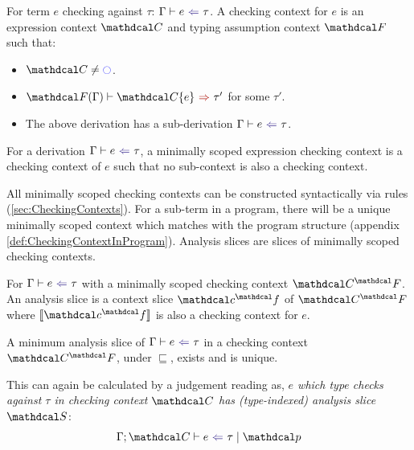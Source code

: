 \begin{definition}
\label{def:CheckingContext}
For term $e$ checking against $\tau$: $\analysis[\Gamma]{e}{\tau}$. A checking context for $e$ is an expression context $\C$ and typing assumption context $\F$ such that: 
\begin{itemize}
\item $\C \neq \cmark$.
\item $\synthesis[\F(\Gamma)]{\C\{e\}}{\tau'}$ for some $\tau'$.
\item The above derivation has a sub-derivation $\analysis[\Gamma]{e}{\tau}$.
\end{itemize}
\end{definition}
\begin{definition}
For a derivation $\analysis[\Gamma]{e}{\tau}$, a minimally scoped expression checking context is a checking context of $e$ such that no sub-context is also a checking context.
\end{definition}

All minimally scoped checking contexts can be constructed syntactically via rules (\cref{sec:CheckingContexts}). For a sub-term in a program, there will be a unique minimally scoped context which matches with the program structure (appendix \cref{def:CheckingContextInProgram}). Analysis slices are slices of minimally scoped checking contexts.
\begin{definition}\label{def:analysisslice}
For $\analysis{e}{\tau}$ with a minimally scoped checking context $\C^\F$. An analysis slice is a context slice $\Cs^\f$ of $\C^\F$ where $\type{\Cs^\f}$ is also a checking context for $e$.
\end{definition}
\begin{conjecture}\label{conj:AnalysisSliceUniqueness}
A minimum analysis slice of $\analysis{e}{\tau}$ in a checking context $\C^\F$, under $\sqsubseteq$, exists and is unique.
\end{conjecture}

This can again be calculated by a judgement reading as, \textit{$e$ which type checks against $\tau$ in checking context $\C$ has (type-indexed) analysis slice $\S$}:
\[\analysisslice{\C}{e}{\tau}{\p}\]

